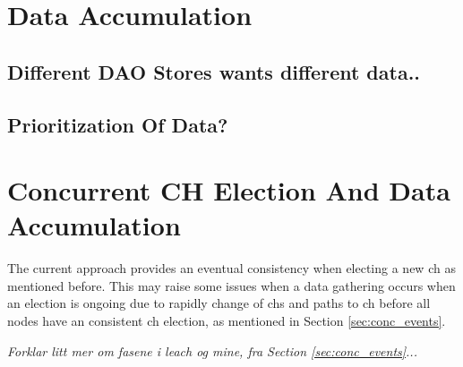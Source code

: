 \documentclass[USenglish]{uit-thesis}
\begin{document}


\section{Data Accumulation}




\subsection{Different DAO Stores wants different data..}
\subsection{Prioritization Of Data?}

\section{Concurrent CH Election And Data Accumulation} \label{disc:simult_el_acc}
The current approach provides an eventual consistency when electing a new \gls{ch} as mentioned before. This may raise some issues when a data gathering occurs when an election is ongoing due to rapidly change of \gls{ch}s and paths to \gls{ch} before all nodes have an consistent \gls{ch} election, as mentioned in Section \ref{sec:conc_events}.

\textit{Forklar litt mer om fasene i \gls{leach} og mine, fra Section \ref{sec:conc_events}...}
\end{document}
